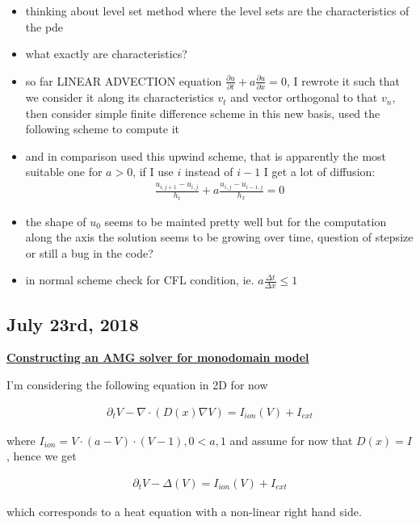 \documentclass[a4paper, 11pt]{article}
\begin{document}
\begin{itemize}
	\item thinking about level set method where the level sets are the characteristics of the pde
	\item what exactly are characteristics?
	\item so far LINEAR ADVECTION equation $\frac{\partial{u}}{\partial{t}} + a\frac{\partial{u}}{\partial{x}} = 0$, I rewrote it such that we consider it along its characteristics $v_t$ and vector orthogonal to that $v_n$, then consider simple finite difference scheme in this new basis, used the following scheme to compute it
	
	\item and in comparison used this upwind scheme, that is apparently the most suitable one for $a > 0$, if I use $i$ instead of $i-1$ I get a lot of diffusion:
	\begin{align*}
	\frac{u_{i,j+1} - u_{i,j}}{h_t} + a \frac{u_{i,j}- u_{i-1,j}}{h_x} = 0
	\end{align*}
	\item the shape of $u_0$ seems to be mainted pretty well but for the computation along the axis the solution seems to be growing over time, question of stepsize or still a bug in the code?
	\item in normal scheme check for CFL condition, ie. $a \frac{\Delta t}{\Delta x} \leq 1$
\end{itemize}

\subsection*{July 23rd, 2018}

\underline{\textbf{Constructing an AMG solver for monodomain model}}

I'm considering the following equation in 2D for now

\begin{align}
\partial_t V - \nabla \cdot (D(x) \nabla V) = I_{ion}(V) + I_{ext}
\end{align}

where $I_{ion} = V \cdot (a-V) \cdot (V - 1), 0 < a , 1$ and assume for now that $D(x) = I$, hence we get 

\begin{align}
\partial_t V - \Delta(V) = I_{ion}(V) + I_{ext}
\end{align}

which corresponds to a heat equation with a non-linear right hand side.
\end{document}
